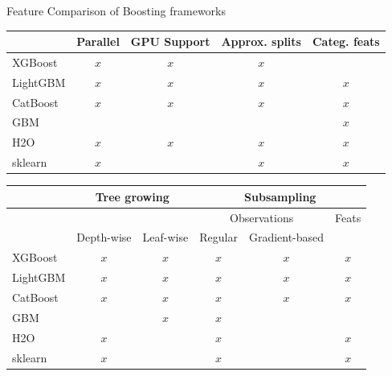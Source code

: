 \documentclass[11pt,compress,t,notes=noshow, xcolor=table]{beamer}
\begin{document}
\begin{vbframe}{Feature Comparison of Boosting frameworks}

  \begin{scriptsize}

\begin{tabular}{lcccc}
  \toprule
   & Parallel & GPU Support & Approx. splits & Categ. feats\\
  \midrule
  XGBoost  & $x$ & $x$ & $x$ &     \\
  LightGBM & $x$ & $x$ & $x$ & $x$ \\
  CatBoost & $x$ & $x$ & $x$ & $x$ \\
  GBM      &     &     &     & $x$ \\
  H2O      & $x$ & $x$ & $x$ & $x$ \\
  sklearn  & $x$ &     & $x$ & $x$ \\
  \bottomrule
\end{tabular}

\lz

\begin{tabular}{lccccc}
  \toprule
   & \multicolumn{2}{c}{Tree growing} & \multicolumn{3}{c}{Subsampling} \\
  \midrule
            &        &               & \multicolumn{2}{c}{Observations} & Feats \\
            & Depth-wise & Leaf-wise & Regular & Gradient-based & \\
  \midrule
  XGBoost   & $x$ & $x$ & $x$ & $x$ & $x$ \\
  LightGBM  & $x$ & $x$ & $x$ & $x$ & $x$ \\
  CatBoost  & $x$ & $x$ & $x$ & $x$ & $x$ \\
  GBM       &     & $x$ & $x$ &     &     \\
  H2O       & $x$ &     & $x$ &     & $x$ \\
  sklearn   & $x$ &     & $x$ &     & $x$ \\
  \bottomrule
\end{tabular}

\end{scriptsize}

\end{vbframe}
\endlecture
\end{document}
